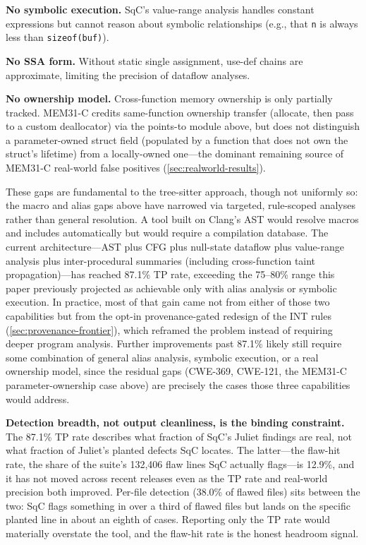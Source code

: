 \textbf{No symbolic execution.}  SqC's value-range analysis handles
constant expressions but cannot reason about symbolic relationships
(e.g., that \texttt{n} is always less than \texttt{sizeof(buf)}).

\textbf{No SSA form.}  Without static single assignment, use-def
chains are approximate, limiting the precision of dataflow analyses.

\textbf{No ownership model.}  Cross-function memory ownership is only
partially tracked.  MEM31-C credits same-function ownership transfer
(allocate, then pass to a custom deallocator) via the points-to module
above, but does not distinguish a parameter-owned struct field
(populated by a function that does not own the struct's lifetime) from
a locally-owned one---the dominant remaining source of MEM31-C
real-world false positives (\cref{sec:realworld-results}).

These gaps are fundamental to the tree-sitter approach, though not
uniformly so: the macro and alias gaps above have narrowed via
targeted, rule-scoped analyses rather than general resolution.  A tool
built on Clang's AST would resolve macros and includes automatically
but would require a compilation database.  The current
architecture---AST plus CFG plus null-state dataflow plus value-range
analysis plus inter-procedural summaries (including cross-function
taint propagation)---has reached 87.1\% TP rate, exceeding the
75--80\% range this paper previously projected as achievable only with
alias analysis or symbolic execution.  In practice, most of that gain
came not from either of those two capabilities but from the opt-in
provenance-gated redesign of the INT rules
(\cref{sec:provenance-frontier}), which reframed the problem instead of
requiring deeper program analysis.  Further improvements past 87.1\%
likely still require some combination of general alias analysis,
symbolic execution, or a real ownership model, since the residual gaps
(CWE-369, CWE-121, the MEM31-C parameter-ownership case above) are
precisely the cases those three capabilities would address.

\textbf{Detection breadth, not output cleanliness, is the binding
constraint.}  The 87.1\% TP rate describes what fraction of SqC's
Juliet findings are real, not what fraction of Juliet's planted
defects SqC locates.  The latter---the flaw-hit rate, the share of
the suite's 132,406 flaw lines SqC actually flags---is 12.9\%, and it
has not moved across recent releases even as the TP rate and
real-world precision both improved.  Per-file detection (38.0\% of
flawed files) sits between the two: SqC flags something in over a
third of flawed files but lands on the specific planted line in about
an eighth of cases.  Reporting only the TP rate would materially
overstate the tool, and the flaw-hit rate is the honest headroom
signal.

